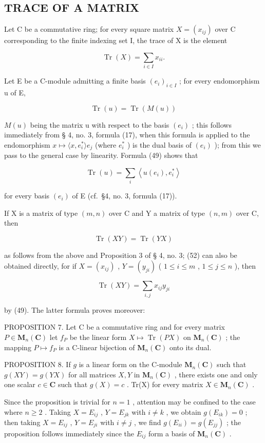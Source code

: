 \subsection{TRACE OF A MATRIX}

Let C be a commutative ring; for every square matrix \(X = (x_{ij})\) over C corresponding to the finite indexing set I, the trace of X is the element

\[
\operatorname{Tr} (X) = \sum_ {i \in I} x _ {i i}.\tag{49}
\]

Let E be a C-module admitting a finite basis \((e_{i})_{i\in I}\) ; for every endomorphism u of E,

\[
\operatorname{Tr} (u) = \operatorname{Tr} (M (u))\tag{50}
\]

\(M(u)\) being the matrix u with respect to the basis \((e_{i})\) ; this follows immediately from § 4, no. 3, formula (17), when this formula is applied to the endomorphism \(x \mapsto \langle x, e_{i}^{*} \rangle e_{j}\) (where \(e_{i}^{*}\) ) is the dual basis of \((e_{i})\) ); from this we pass to the general case by linearity. Formula (49) shows that

\[
\operatorname{Tr} (u) = \sum_ {i} \left\langle u (e _ {i}), e _ {i} ^ {*} \right\rangle\tag{51}
\]

for every basis \((e_i)\) of E (cf.~§4, no. 3, formula (17)).

If X is a matrix of type \((m, n)\) over C and Y a matrix of type \((n, m)\) over C, then

\[
\operatorname{Tr} (X Y) = \operatorname{Tr} (Y X)\tag{52}
\]

as follows from the above and Proposition 3 of § 4, no. 3; (52) can also be obtained directly, for if \(X = (x_{ij})\) , \(Y = (y_{ji})\) ( \(1 \leqslant i \leqslant m\) , \(1 \leqslant j \leqslant n\) ), then

\[
\operatorname{Tr} (X Y) = \sum_ {i, j} x _ {i j} y _ {j i}\tag{53}
\]

by (49). The latter formula proves moreover:

PROPOSITION 7. Let C be a commutative ring and for every matrix \(P \in \mathbf{M}_n(\mathbf{C})\) let \(f_P\) be the linear form \(X \mapsto \operatorname{Tr}(PX)\) on \(\mathbf{M}_n(\mathbf{C})\) ; the mapping \(P \mapsto f_P\) is a C-linear bijection of \(\mathbf{M}_n(\mathbf{C})\) onto its dual.

PROPOSITION 8. If \(g\) is a linear form on the C-module \(\mathbf{M}_n(\mathbf{C})\) such that \(g(XY) = g(YX)\) for all matrices \(X, Y\) in \(\mathbf{M}_n(\mathbf{C})\) , there exists one and only one scalar \(c \in \mathbf{C}\) such that \(g(X) = c\) . Tr(X) for every matrix \(X \in \mathbf{M}_n(\mathbf{C})\) .

Since the proposition is trivial for \(n = 1\) , attention may be confined to the case where \(n \geqslant 2\) . Taking \(X = E_{ij}\) , \(Y = E_{jk}\) with \(i \neq k\) , we obtain \(g(E_{ik}) = 0\) ; then taking \(X = E_{ij}\) , \(Y = E_{ji}\) with \(i \neq j\) , we find \(g(E_{ii}) = g(E_{jj})\) ; the proposition follows immediately since the \(E_{ij}\) form a basis of \(\mathbf{M}_n(\mathbf{C})\) .

